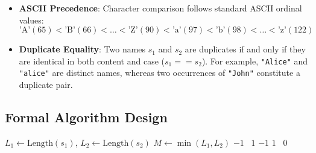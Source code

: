 \begin{itemize}
    \item \textbf{ASCII Precedence}: Character comparison follows standard ASCII ordinal values:
    \[
    \text{'A'} (65) < \text{'B'} (66) < \dots < \text{'Z'} (90) < \text{'a'} (97) < \text{'b'} (98) < \dots < \text{'z'} (122)
    \]
    \item \textbf{Duplicate Equality}: Two names $s_1$ and $s_2$ are duplicates if and only if they are identical in both content and case ($s_1 == s_2$). For example, \texttt{"Alice"} and \texttt{"alice"} are distinct names, whereas two occurrences of \texttt{"John"} constitute a duplicate pair.
\end{itemize}

\subsection{Formal Algorithm Design}

\begin{algorithm}[H]
\caption{Explicit Character-by-Character String Comparison}
\begin{algorithmic}[1]
    \State $L_1 \gets \text{Length}(s_1)$, $L_2 \gets \text{Length}(s_2)$
    \State $M \gets \min(L_1, L_2)$
             \Return $-1$
            \Else \ \Return $1$
            \EndIf
        \EndIf
    \EndFor
     \Return $-1$
     \Return $1$
    \Else \ \Return $0$
    \EndIf
\EndFunction
\end{algorithmic}
\end{algorithm}

